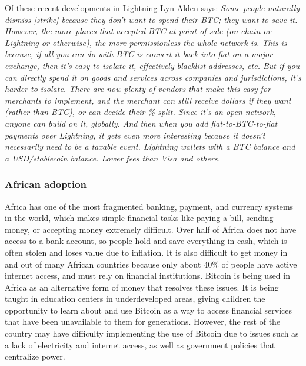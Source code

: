 Of these recent developments in Lightning \href{https://twitter.com/LynAldenContact/status/1512188883101966351}{Lyn Alden says}: \textit{Some people naturally dismiss [strike] because they don't want to spend their BTC; they want to save it. However, the more places that accepted BTC at point of sale (on-chain or Lightning or otherwise), the more permissionless the whole network is. This is because, if all you can do with BTC is convert it back into fiat on a major exchange, then it's easy to isolate it, effectively blacklist addresses, etc. But if you can directly spend it on goods and services across companies and jurisdictions, it's harder to isolate. There are now plenty of vendors that make this easy for merchants to implement, and the merchant can still receive dollars if they want (rather than BTC), or can decide their \% split. Since it's an open network, anyone can build on it, globally. And then when you add fiat-to-BTC-to-fiat payments over Lightning, it gets even more interesting because it doesn't necessarily need to be a taxable event. Lightning wallets with a BTC balance and a USD/stablecoin balance. Lower fees than Visa and others.}\par
\subsubsection{African adoption}
Africa has one of the most fragmented banking, payment, and currency systems in the world, which makes simple financial tasks like paying a bill, sending money, or accepting money extremely difficult. Over half of Africa does not have access to a bank account, so people hold and save everything in cash, which is often stolen and loses value due to inflation. It is also difficult to get money in and out of many African countries because only about 40\% of people have active internet access, and must rely on financial institutions. Bitcoin is being used in Africa as an alternative form of money that resolves these issues. It is being taught in education centers in underdeveloped areas, giving children the opportunity to learn about and use Bitcoin as a way to access financial services that have been unavailable to them for generations. However, the rest of the country may have difficulty implementing the use of Bitcoin due to issues such as a lack of electricity and internet access, as well as government policies that centralize power.
